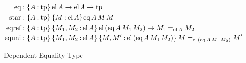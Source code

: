 \documentclass[11pt,twoside]{article}
\newcommand{\braces}[1]{\{#1\}}
\newcommand{\const}[1]{\text{#1}}
\newcommand{\eqclass}[3]{{#2}=_{#1}{#3}}
\newcommand{\piclass}[3]{\braces{{#2}\mathbin{:}{#1}}\,{#3}}
\newcommand{\arrclass}[2]{{#1}\to{#2}}
\newcommand{\appobj}[2]{{#1}\,{#2}}
\begin{document}
\begin{figure}
  
  \begin{align*}
    \eqcon & : \piclass{\tpsort}{A}{\arrclass{\elof{A}}{\arrclass{\elof{A}}{\tpsort}}} \\
    \selfcon & : \piclass{\tpsort}{A}{\piclass{\elof{A}}{M}{\eqof{A}{M}{M}}} \\
    \eqrefcon  & :
         \piclass{\tpsort}{A}{\piclass{\elof{A}}{M_{1},M_{2}}{\arrclass{\elofp{\eqof{A}{M_{1}}{M_{2}}}}{\eqclass{\elof{A}}{M_{1}}{M_{2}}}}}  \\
    \equnicon & :
          \piclass{\tpsort}{A}{\piclass{\elof{A}}{M_{1},M_{2}}{\piclass{\elofp{\eqof{A}{M_{1}}{M_{2}}}}{M,M'}{\eqclass{\elofp{\eqof{A}{M_{1}}{M_{2}}}}{M}{M'}}}}
  \end{align*}

  \caption{Dependent Equality Type}
  \label{fig:dep-eq}
\end{figure}

\newcommand{\idcon}{\const{id}}
\newcommand{\idof}[3]{\appobj{\appobj{\appobj{\idcon}{#1}}{#2}}{#3}}
\newcommand{\reflcon}{\const{refl}}
\newcommand{\reflof}[2]{\appobj{\appobj{\reflcon}{#1}}{#2}}
\newcommand{\jcon}{\const{j}}
\newcommand{\jof}[6]{\appobj{\appobj{\appobj{\appobj{\appobj{\appobj{\jcon}{#1}}{#2}}{#3}}{#4}}{#5}}{#6}}
\newcommand{\idbetacon}{\const{id-$\beta$}}
\end{document}
